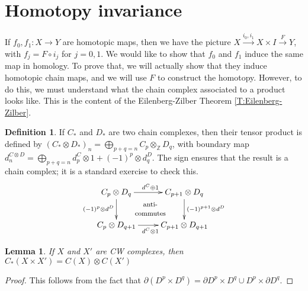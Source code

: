 \documentclass[12pt]{article}
\theoremstyle{plain}
\newtheorem{lemma}[equation]{Lemma}
\theoremstyle{definition}
\newtheorem{definition}[equation]{Definition}
\theoremstyle{remark}
\newcommand{\ZZ}{\ensuremath{\mathbb{Z}}}
\begin{document}
 \section{Homotopy invariance}
 If $f_0,f_1:X\to Y$ are homotopic maps, then we have the picture $X\xrightarrow{i_0,
 i_1} X\times I \xrightarrow{F} Y$, with $f_j=F\circ i_j$ for $j=0,1$. We would like to
 show that $f_0$ and $f_1$ induce the same map in homology. To prove that, we will
 actually show that they induce homotopic chain maps, and we will use $F$ to construct
 the homotopy. However, to do this, we must understand what the chain complex associated
 to a product looks like. This is the content of the Eilenberg-Zilber Theorem
 \ref{T:Eilenberg-Zilber}.

 \begin{definition}
   If $C_*$ and $D_*$ are two chain complexes, then their tensor product is defined by
   $(C_*\otimes D_*)_n = \bigoplus_{p+q=n} C_p\otimes_\ZZ D_q$, with boundary map $d^{C\otimes
   D}_n = \bigoplus_{p+q=n} d^C_p\otimes 1 + (-1)^p\otimes d^D_q$. The sign ensures that
   the result is a chain complex; it is a standard exercise to check this.
   \[\xymatrix{
   C_p\otimes D_q \ar[r]^{d^C\oplus 1} \ar[d]_{(-1)^p\otimes d^D} & C_{p+1}\otimes D_q \ar[d]^{(-1)^{p+1}\otimes d^D}\\
   C_p\otimes D_{q+1} \ar[r]_{d^C\otimes 1} \ar@{}[ru]|{\txt{\footnotesize anti-\\ \footnotesize commutes}} & C_{p+1}\otimes D_{q+1}
   }\]
 \end{definition}
 \begin{lemma}
   If $X$ and $X'$ are CW complexes, then $C_*(X\times X')=C(X)\otimes C(X')$
 \end{lemma}
 \begin{proof}
   This follows from the fact that $\partial (D^p\times D^q)=\partial D^p\times D^q \cup
   D^p\times \partial D^q$.
 \end{proof}
\end{document}
